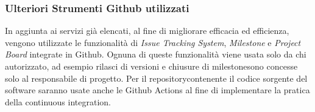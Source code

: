 	\subsubsection{Ulteriori Strumenti Github utilizzati}
		In aggiunta ai servizi già elencati, al fine di migliorare efficacia ed efficienza, vengono utilizzate le funzionalità di \textit{Issue Tracking System},
		\textit{Milestone} e \textit{Project Board} integrate in Github. Ognuna di queste funzionalità viene usata solo da chi autorizzato, ad esempio rilasci di versioni e chiusure di milestone\glosp sono concesse solo al responsabile di progetto.
		\newline
		Per il repository\glosp contenente il codice sorgente del software saranno usate anche le Github Actions al fine di implementare la pratica della continuous integration.
		